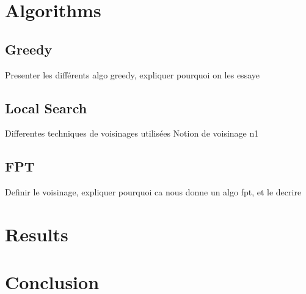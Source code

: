 \documentclass{article}
\begin{document}
\section{Algorithms}
\subsection{Greedy}
Presenter les différents algo greedy, expliquer pourquoi on les essaye
\subsection{Local Search}
Differentes techniques de voisinages utilisées Notion de voisinage n1
\subsection{FPT}
Definir le voisinage, expliquer pourquoi ca nous donne un algo fpt, et le decrire 
\section{Results}
\section{Conclusion}
\end{document}
